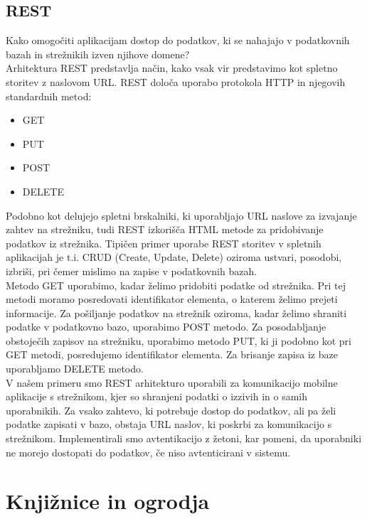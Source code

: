 \documentclass[a4paper, 12pt]{book}
\begin{document}
\subsection{REST}
Kako omogočiti aplikacijam dostop do podatkov, ki se nahajajo v podatkovnih bazah in strežnikih izven njihove domene? \\Arhitektura REST predstavlja način, kako vsak vir predstavimo kot spletno storitev z naslovom URL. REST določa uporabo protokola HTTP in njegovih standardnih metod:
\begin{itemize}
\item GET
\item PUT
\item POST
\item DELETE
\end{itemize}
Podobno kot delujejo spletni brskalniki, ki uporabljajo URL naslove za izvajanje zahtev na strežniku, tudi REST izkorišča HTML metode za pridobivanje podatkov iz strežnika. Tipičen primer uporabe REST storitev v spletnih aplikacijah je t.i. CRUD (Create, Update, Delete) oziroma ustvari, posodobi, izbriši, pri čemer mislimo na zapise v podatkovnih bazah.\\ Metodo GET uporabimo, kadar želimo pridobiti podatke od strežnika. Pri tej metodi moramo posredovati identifikator elementa, o katerem želimo prejeti informacije. Za pošiljanje podatkov na strežnik oziroma, kadar želimo shraniti podatke v podatkovno bazo, uporabimo POST metodo. Za posodabljanje obstoječih zapisov na strežniku, uporabimo metodo PUT, ki ji podobno kot pri GET metodi, posredujemo identifikator elementa. Za brisanje zapisa iz baze uporabljamo DELETE metodo.\\  V našem primeru smo REST arhitekturo uporabili za komunikacijo mobilne aplikacije s strežnikom, kjer so shranjeni podatki o izzivih in o samih uporabnikih. Za vsako zahtevo, ki potrebuje dostop do podatkov, ali pa želi podatke zapisati v bazo, obstaja URL naslov, ki poskrbi za komunikacijo s strežnikom. Implementirali smo avtentikacijo z žetoni, kar pomeni, da uporabniki ne morejo dostopati do podatkov, če niso avtenticirani v sistemu. 

\section{Knjižnice in ogrodja}
\end{document}
